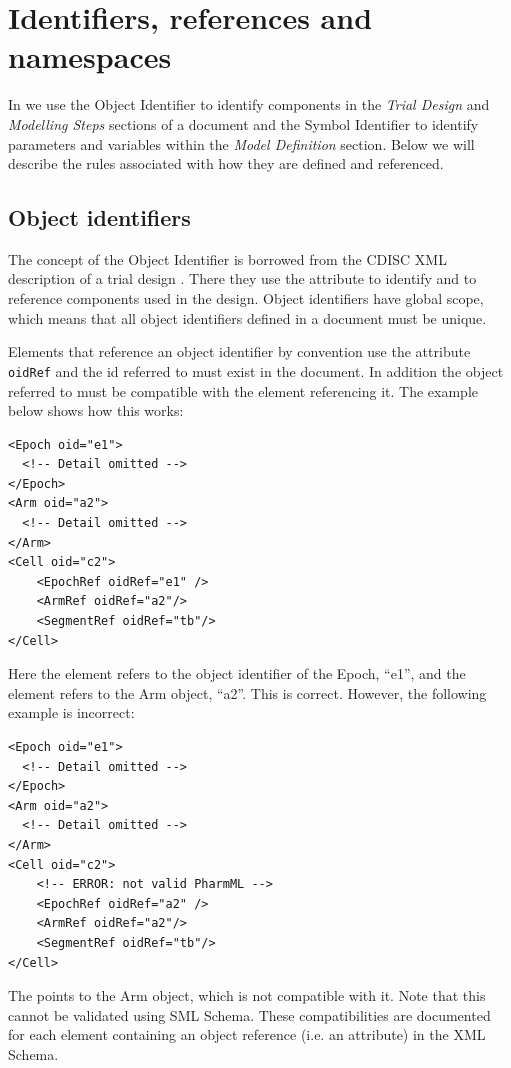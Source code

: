 \section{Identifiers, references and namespaces}

In \pharmml we use the Object Identifier  to identify components in the
\emph{Trial Design} and \emph{Modelling Steps} sections of a \pharmml document and
the Symbol Identifier  to identify parameters and variables within the
\emph{Model Definition} section. Below we will describe the rules associated
with how they are defined and referenced.


\subsection{Object identifiers}

The concept of the Object Identifier is borrowed from the CDISC XML
description of a trial design \cite{CDISC:2011a}. There they use the
attribute  to identify and to reference components used in
the design. Object identifiers have global scope, which means that all
object identifiers defined in a \pharmml document must be unique.

Elements that reference an object identifier by convention use the
attribute \texttt{oidRef} and the id referred to must exist in the
\pharmml document. In addition the object referred to must be
compatible with the element referencing it. The example below shows
how this works:
%
\lstset{language=XML}
\begin{lstlisting}
<Epoch oid="e1">
  <!-- Detail omitted -->
</Epoch>
<Arm oid="a2">
  <!-- Detail omitted -->
</Arm>
<Cell oid="c2">
    <EpochRef oidRef="e1" />
    <ArmRef oidRef="a2"/>
    <SegmentRef oidRef="tb"/>
</Cell>
\end{lstlisting}
%
Here the element  refers to the object identifier of
the Epoch, ``e1'', and the  element refers to the Arm
object, ``a2''. This is correct. However, the following example
is incorrect:
%
\lstset{language=XML}
\begin{lstlisting}
<Epoch oid="e1">
  <!-- Detail omitted -->
</Epoch>
<Arm oid="a2">
  <!-- Detail omitted -->
</Arm>
<Cell oid="c2">
    <!-- ERROR: not valid PharmML -->
    <EpochRef oidRef="a2" />
    <ArmRef oidRef="a2"/>
    <SegmentRef oidRef="tb"/>
</Cell>
\end{lstlisting}
%
The  points to the Arm object, which is not compatible
with it. Note that this cannot be validated using SML Schema. 
These compatibilities are documented for each element
containing an object reference (i.e.\xspace an 
attribute) in the XML Schema. 


